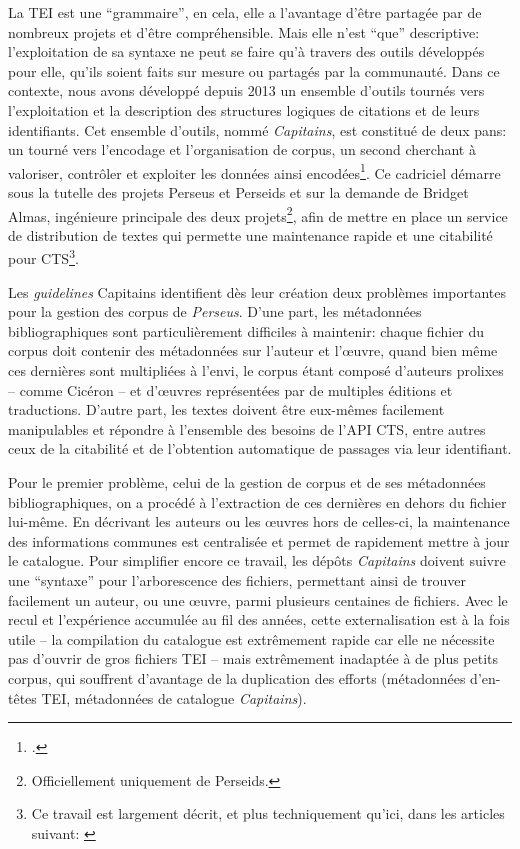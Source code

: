 La TEI est une \enquote{grammaire}, en cela, elle a l'avantage d'être partagée par de nombreux projets et d'être compréhensible. Mais elle n'est \enquote{que} descriptive: l'exploitation de sa syntaxe ne peut se faire qu'à travers des outils développés pour elle, qu'ils soient faits sur mesure ou partagés par la communauté. Dans ce contexte, nous avons développé depuis 2013 un ensemble d'outils tournés vers l'exploitation et la description des structures logiques de citations et de leurs identifiants. Cet ensemble d'outils, nommé \textit{Capitains}, est constitué de deux pans: un tourné vers l'encodage et l'organisation de corpus, un second cherchant à valoriser, contrôler et exploiter les données ainsi encodées\footcite{clerice_capitains_2015}. Ce cadriciel démarre sous la tutelle des projets Perseus et Perseids et sur la demande de Bridget Almas, ingénieure principale des deux projets\footnote{Officiellement uniquement de Perseids.}, afin de mettre en place un service de distribution de textes qui permette une maintenance rapide et une citabilité pour CTS\footnote{Ce travail est largement décrit, et plus techniquement qu'ici, dans les articles suivant: \textcite{almas_continuous_2018, clerice_les_2017}}. 

Les \textit{guidelines} Capitains identifient dès leur création deux problèmes importantes pour la gestion des corpus de \textit{Perseus}. D'une part, les métadonnées bibliographiques sont particulièrement difficiles à maintenir: chaque fichier du corpus doit contenir des métadonnées sur l'auteur et l'œuvre, quand bien même ces dernières sont multipliées à l'envi, le corpus étant composé d'auteurs prolixes -- comme Cicéron -- et d'œuvres représentées par de multiples éditions et traductions.  D'autre part, les textes doivent être eux-mêmes facilement manipulables et répondre à l'ensemble des besoins de l'API CTS, entre autres ceux de la citabilité et de l'obtention automatique de passages via leur identifiant.

Pour le premier problème, celui de la gestion de corpus et de ses métadonnées bibliographiques, on a procédé à l'extraction de ces dernières en dehors du fichier lui-même. En décrivant les auteurs ou les œuvres hors de celles-ci, la maintenance des informations communes est centralisée et permet de rapidement mettre à jour le catalogue. Pour simplifier encore ce travail, les dépôts \textit{Capitains} doivent suivre une \enquote{syntaxe} pour l'arborescence des fichiers, permettant ainsi de trouver facilement un auteur, ou une œuvre, parmi plusieurs centaines de fichiers. Avec le recul et l'expérience accumulée au fil des années, cette externalisation est à la fois utile -- la compilation du catalogue est extrêmement rapide car elle ne nécessite pas d'ouvrir de gros fichiers TEI -- mais extrêmement inadaptée à de plus petits corpus, qui souffrent d'avantage de la duplication des efforts (métadonnées d'en-têtes TEI, métadonnées de catalogue \textit{Capitains}).

